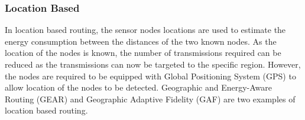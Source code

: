 
\subsubsection{Location Based}
In location based routing, the sensor nodes locations are used to estimate the energy consumption between the distances of the two known nodes. As the location of the nodes is known, the number of transmissions required can be reduced as the transmissions can now be targeted to the specific region. However, the nodes are required to be equipped with Global Positioning System (GPS) to allow location of the nodes to be detected. Geographic and Energy-Aware Routing (GEAR) \cite{gear} and Geographic Adaptive Fidelity (GAF) \cite{gaf} are two examples of location based routing.


